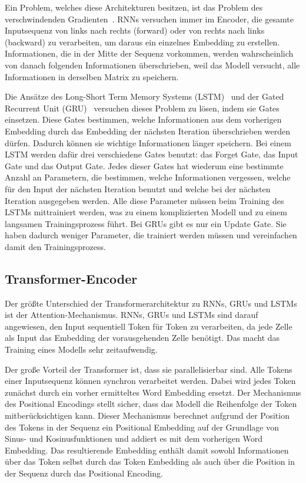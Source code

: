 Ein Problem, welches diese Architekturen besitzen, ist das Problem des verschwindenden Gradienten~\cite{bengio1994}.
RNNs versuchen immer im Encoder, die gesamte Inputsequenz von links nach rechts (forward) oder von rechts nach links (backward) zu verarbeiten, um daraus ein einzelnes Embedding zu erstellen.
Informationen, die in der Mitte der Sequenz vorkommen, werden wahrscheinlich von danach folgenden Informationen überschrieben, weil das Modell versucht, alle Informationen in derselben Matrix zu speichern.

Die Ansätze des Long-Short Term Memory Systems (LSTM)~\cite{hochreiter1997} und der Gated Recurrent Unit (GRU)~\cite{cho2014} versuchen dieses Problem zu lösen, indem sie Gates einsetzen.
Diese Gates bestimmen, welche Informationen aus dem vorherigen Embedding durch das Embedding der nächsten Iteration überschrieben werden dürfen.
Dadurch können sie wichtige Informationen länger speichern.
Bei einem LSTM werden dafür drei verschiedene Gates benutzt: das Forget Gate, das Input Gate und das Output Gate.
Jedes dieser Gates hat wiederum eine bestimmte Anzahl an Parametern, die bestimmen, welche Informationen vergessen, welche für den Input der nächsten Iteration benutzt und welche bei der nächsten Iteration ausgegeben werden.
Alle diese Parameter müssen beim Training des LSTMs mittrainiert werden, was zu einem komplizierten Modell und zu einem langsamen Trainingsprozess führt.
Bei GRUs gibt es nur ein Update Gate.
Sie haben dadurch weniger Parameter, die trainiert werden müssen und vereinfachen damit den Trainingsprozess.~\cite{pirani2022}

\subsection{Transformer-Encoder}

Der größte Unterschied der Transformerarchitektur zu RNNs, GRUs und LSTMs ist der Attention-Mechanismus.
RNNs, GRUs und LSTMs sind darauf angewiesen, den Input sequentiell Token für Token zu verarbeiten, da jede Zelle als Input das Embedding der vorausgehenden Zelle benötigt.
Das macht das Training eines Modells sehr zeitaufwendig.

Der große Vorteil der Transformer ist, dass sie parallelisierbar sind.
Alle Tokens einer Inputsequenz können synchron verarbeitet werden.
Dabei wird jedes Token zunächst durch ein vorher ermitteltes Word Embedding ersetzt.
Der Mechanismus des Positional Encodings stellt sicher, dass das Modell die Reihenfolge der Token mitberücksichtigen kann.
Dieser Mechanismus berechnet aufgrund der Position des Tokens in der Sequenz ein Positional Embedding auf der Grundlage von Sinus- und Kosinusfunktionen und addiert es mit dem vorherigen Word Embedding.
Das resultierende Embedding enthält damit sowohl Informationen über das Token selbst durch das Token Embedding als auch über die Position in der Sequenz durch das Positional Encoding.

